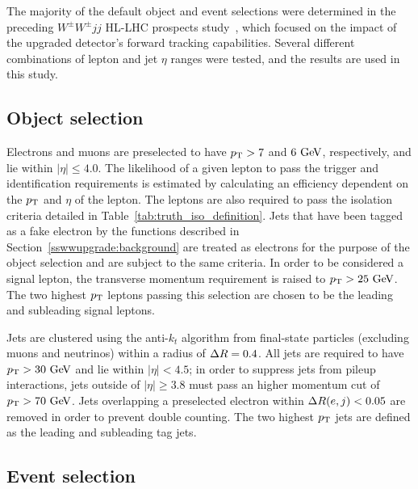 The majority of the default object and event selections were determined in the preceding $W^{\pm}W^{\pm}jj$ HL-LHC prospects study~\cite{2017.ssww-upgrade}, which focused on the impact of the upgraded detector's forward tracking capabilities.
Several different combinations of lepton and jet $\eta$ ranges were tested, and the results are used in this study. 

\subsection{Object selection}\label{sswwupgrade:object_selection}
Electrons and muons are preselected to have $p_{\mathrm{T}} > 7$ and $6\gev$, respectively, and lie within $|\eta| \le 4.0$.
The likelihood of a given lepton to pass the trigger and identification requirements is estimated by calculating an efficiency dependent on the $p_{\mathrm{T}}$ and $\eta$ of the lepton.
The leptons are also required to pass the isolation criteria detailed in Table~\ref{tab:truth_iso_definition}.
Jets that have been tagged as a fake electron by the functions described in Section~\ref{sswwupgrade:background} are treated as electrons for the purpose of the object selection and are subject to the same criteria.
In order to be considered a signal lepton, the transverse momentum requirement is raised to $\pt > 25\gev$.
The two highest $p_{\mathrm{T}}$ leptons passing this selection are chosen to be the leading and subleading signal leptons.

Jets are clustered using the anti-$k_t$ algorithm from final-state particles (excluding muons and neutrinos) within a radius of $\Delta R = 0.4$.
All jets are required to have $\pt > 30\gev$ and lie within $|\eta| < 4.5$; in order to suppress jets from pileup interactions, jets outside of $|\eta| \ge 3.8$ must pass an higher momentum cut of $\pt > 70\gev$.
Jets overlapping a preselected electron within $\Delta R(e,j) < 0.05$ are removed in order to prevent double counting.
The two highest $p_{\mathrm{T}}$ jets are defined as the leading and subleading tag jets.


\subsection{Event selection}\label{sswwupgrade:event_selection}

